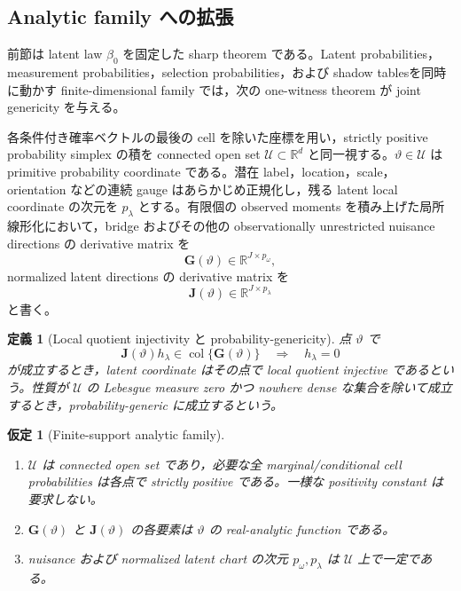 \documentclass[11pt,a4paper]{ltjsarticle}
\newtheorem{assumption}{仮定}[section]
\newtheorem{definition}{定義}[section]
\theoremstyle{remark}
\newcommand{\R}{\mathbb R}
\newcommand{\col}{\operatorname{col}}
\begin{document}
\subsection{Analytic family への拡張}
前節は latent law $\beta_0$ を固定した sharp theorem である。Latent probabilities，measurement probabilities，selection probabilities，および shadow tablesを同時に動かす finite-dimensional family では，次の one-witness theorem が joint genericity を与える。

各条件付き確率ベクトルの最後の cell を除いた座標を用い，strictly positive probability simplex の積を connected open set $\mathcal U\subset\R^d$ と同一視する。$\vartheta\in\mathcal U$ は primitive probability coordinate である。潜在 label，location，scale，orientation などの連続 gauge はあらかじめ正規化し，残る latent local coordinate の次元を $p_\lambda$ とする。有限個の observed moments を積み上げた局所線形化において，bridge およびその他の observationally unrestricted nuisance directions の derivative matrix を
\[
\mathbf G(\vartheta)\in\R^{J\times p_\omega},
\]
normalized latent directions の derivative matrix を
\[
\mathbf J(\vartheta)\in\R^{J\times p_\lambda}
\]
と書く。

\begin{definition}[Local quotient injectivity と probability-genericity]\label{def:genericquotient}
点 $\vartheta$ で
\begin{equation}
\mathbf J(\vartheta)h_\lambda\in\col\{\mathbf G(\vartheta)\}
\quad\Longrightarrow\quad h_\lambda=0
\label{eq:finitequotientinjective}
\end{equation}
が成立するとき，latent coordinate はその点で local quotient injective であるという。性質が $\mathcal U$ の Lebesgue measure zero かつ nowhere dense な集合を除いて成立するとき，probability-generic に成立するという。
\end{definition}

\begin{assumption}[Finite-support analytic family]\label{as:analyticfamily}
\begin{enumerate}[label=(GA\arabic*)]
\item $\mathcal U$ は connected open set であり，必要な全 marginal/conditional cell probabilities は各点で strictly positive である。一様な positivity constant は要求しない。
\item $\mathbf G(\vartheta)$ と $\mathbf J(\vartheta)$ の各要素は $\vartheta$ の real-analytic function である。
\item nuisance および normalized latent chart の次元 $p_\omega,p_\lambda$ は $\mathcal U$ 上で一定である。
\end{enumerate}
\end{assumption}
\end{document}
